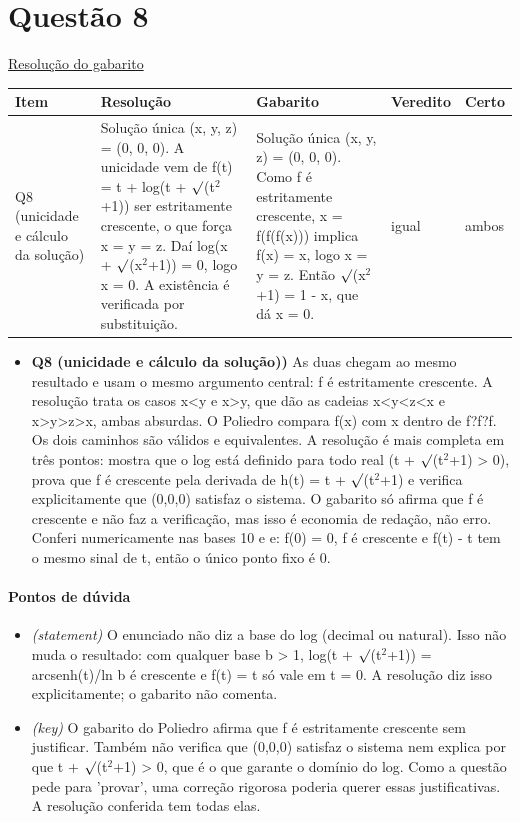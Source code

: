 \documentclass{article}%
\begin{document}
\section*{Questão 8}%
\href{https://poliedroresolve.sistemapoliedro.com.br/vestibulares/ime/2026/ime-2-fase-dia-1-23-10-2025-2-fase-dia-1/dissertativa-8-matematica-2-fase-dia-1-ime-2026}{Resolução do gabarito}\par\smallskip%
\begin{longtable}{@{}p{} p{} p{} p{} p{}@{}}\toprule Item & Resolução & Gabarito & Veredito & Certo \\ \midrule
Q8 (unicidade e cálculo da solução) & Solução única (x, y, z) = (0, 0, 0). A unicidade vem de f(t) = t + log(t + $\surd$(t$^2$+1)) ser estritamente crescente, o que força x = y = z. Daí log(x + $\surd$(x$^2$+1)) = 0, logo x = 0. A existência é verificada por substituição. & Solução única (x, y, z) = (0, 0, 0). Como f é estritamente crescente, x = f(f(f(x))) implica f(x) = x, logo x = y = z. Então $\surd$(x$^2$+1) = 1 - x, que dá x = 0. & igual & ambos \\
\bottomrule\end{longtable}%
\begin{itemize}%
\item%
\textbf{Q8 (unicidade e cálculo da solução))} As duas chegam ao mesmo resultado e usam o mesmo argumento central: f é estritamente crescente. A resolução trata os casos x<y e x>y, que dão as cadeias x<y<z<x e x>y>z>x, ambas absurdas. O Poliedro compara f(x) com x dentro de f?f?f. Os dois caminhos são válidos e equivalentes. A resolução é mais completa em três pontos: mostra que o log está definido para todo real (t + $\surd$(t$^2$+1) > 0), prova que f é crescente pela derivada de h(t) = t + $\surd$(t$^2$+1) e verifica explicitamente que (0,0,0) satisfaz o sistema. O gabarito só afirma que f é crescente e não faz a verificação, mas isso é economia de redação, não erro. Conferi numericamente nas bases 10 e e: f(0) = 0, f é crescente e f(t) - t tem o mesmo sinal de t, então o único ponto fixo é 0.%
\end{itemize}%
\paragraph{Pontos de dúvida}%
\begin{itemize}%
\item%
\textit{(statement)} O enunciado não diz a base do log (decimal ou natural). Isso não muda o resultado: com qualquer base b > 1, log(t + $\surd$(t$^2$+1)) = arcsenh(t)/ln b é crescente e f(t) = t só vale em t = 0. A resolução diz isso explicitamente; o gabarito não comenta.%
\item%
\textit{(key)} O gabarito do Poliedro afirma que f é estritamente crescente sem justificar. Também não verifica que (0,0,0) satisfaz o sistema nem explica por que t + $\surd$(t$^2$+1) > 0, que é o que garante o domínio do log. Como a questão pede para 'provar', uma correção rigorosa poderia querer essas justificativas. A resolução conferida tem todas elas.%
\end{itemize}%
\end{document}
